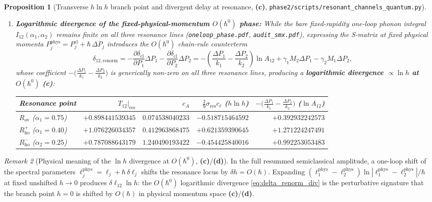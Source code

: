 \documentclass[11pt,a4paper]{article}
\newcommand{\Lc}{\textsf{\textbf{(c)}}\xspace}
\newcommand{\Ld}{\textsf{\textbf{(d)}}\xspace}
\newcommand{\hb}{\hbar}
\newcommand{\squant}{\texttt{phase2/\allowbreak scripts/\allowbreak resonant\_\allowbreak channels\_\allowbreak quantum.py}}
\newtheorem{proposition}{Proposition}[section]
\theoremstyle{remark}
\newtheorem{remark}[proposition]{Remark}
\begin{document}
\begin{proposition}[Transverse $h\ln h$ branch point and divergent delay at resonance, \Lc, \squant]
\begin{enumerate}
\item \textbf{Logarithmic divergence of the fixed-physical-momentum $O(\hb^0)$ phase:}
While the bare fixed-rapidity one-loop phonon integral $I_{12}(\alpha_1,\alpha_2)$
remains finite on all three resonance lines (\texttt{oneloop\_phase.pdf},
\texttt{audit\_smx.pdf}), expressing the S-matrix at fixed physical momenta
$P_j^{\mathrm{phys}} = P_j^{\mathrm{cl}} + \hb\,\Delta P_j$ introduces the
$O(\hb^0)$ chain-rule counterterm
\begin{equation}\label{eq:delta_renorm_div}
  \delta_{12,\mathrm{renorm}}
  = -\frac{\partial\delta_{\mathrm{cl}}}{\partial P_1}\Delta P_1
    -\frac{\partial\delta_{\mathrm{cl}}}{\partial P_2}\Delta P_2
  = -\left(\frac{\Delta P_1}{k_1} - \frac{\Delta P_2}{k_2}\right)\ln A_{12}
    + \gamma_1 M_2\Delta P_1 - \gamma_2 M_1\Delta P_2,
\end{equation}
whose coefficient $-\big(\frac{\Delta P_1}{k_1}-\frac{\Delta P_2}{k_2}\big)$ is
generically non-zero on all three resonance lines, producing a \textbf{logarithmic
divergence $\propto \ln h$ at $O(\hb^0)$} \Lc:
\begin{center}\footnotesize
\begin{tabular}{@{}lrrrr@{}}\toprule
Resonance point & $T_{12}|_{\mathrm{res}}$ & $c_A$ & $\frac{2}{9}\sigma_{\mathrm{res}}c_\ell$ ($h\ln h$) & $-\big(\frac{\Delta P_1}{k_1}-\frac{\Delta P_2}{k_2}\big)$ ($\ln A_{12}$) \\\midrule
$R_{\mathrm{ov}}$ ($\alpha_1=0.75$) & $+0.898441539345$ & $0.074538040233$ & $-0.518715464592$ & $+0.392932242573$ \\
$R_{\mathrm{ho}}^+$ ($\alpha_1=0.40$) & $+1.076226034357$ & $0.412963868475$ & $+0.621359390645$ & $+1.271224247491$ \\
$R_{\mathrm{ho}}^-$ ($\alpha_2=0.25$) & $+0.787088643179$ & $1.240490193422$ & $-0.454425840016$ & $+0.992253053483$ \\\bottomrule
\end{tabular}
\end{center}
\end{enumerate}
\end{proposition}

\begin{remark}[Physical meaning of the $\ln h$ divergence at $O(\hb^0)$, \Lc/\Ld]
In the full resummed semiclassical amplitude, a one-loop shift of the spectral
parameters $\ell_j^{\mathrm{phys}} = \ell_j + \hb\,\delta\ell_j$ shifts the
resonance locus by $\delta h = O(\hb)$. Expanding
$(\ell_1^{\mathrm{phys}}-\ell_2^{\mathrm{phys}})\ln|\ell_1^{\mathrm{phys}}-\ell_2^{\mathrm{phys}}|/\hb$
at fixed unshifted $h \to 0$ produces $\delta\ell_{12}\ln h$: the $O(\hb^0)$
logarithmic divergence \eqref{eq:delta_renorm_div} is the perturbative signature
that the branch point $h=0$ is shifted by $O(\hb)$ in physical momentum space \Lc/\Ld.
\end{remark}
\end{document}
